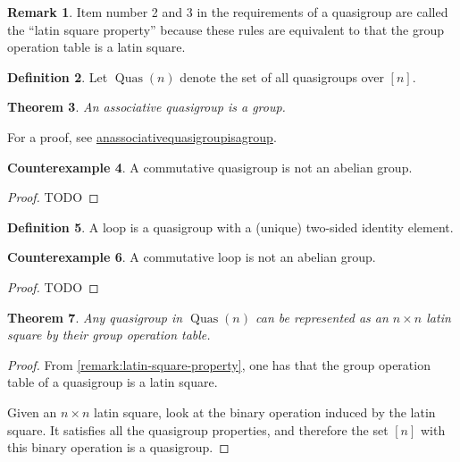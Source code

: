 \documentclass[a4paper, 12pt, english]{article}
\theoremstyle{plain}
\newtheorem{theorem}{Theorem}[section]
\theoremstyle{definition}
\newtheorem{definition}[theorem]{Definition}
\newtheorem{counterexample}[theorem]{Counterexample}
\newtheorem{remark}[theorem]{Remark}
\DeclareMathOperator{\Quas}{Quas}
\begin{document}
\begin{remark} \label{remark:latin-square-property}
    Item number 2 and 3 in the requirements of a quasigroup are called the ``latin square property'' because these rules are equivalent to that the group operation table is a latin square.
\end{remark}

\begin{definition}
    Let \( \Quas(n) \) denote the set of all quasigroups over \( [n] \).
\end{definition}

\begin{theorem}
    An associative quasigroup is a group.
\end{theorem}
For a proof, see \href{https://www.planetmath.org/anassociativequasigroupisagroup}{anassociativequasigroupisagroup}.

\begin{counterexample}
    A commutative quasigroup is not an abelian group.
\end{counterexample}
\begin{proof}
    TODO
\end{proof}

\begin{definition}
    A loop is a quasigroup with a (unique) two-sided identity element.
\end{definition}

\begin{counterexample}
    A commutative loop is not an abelian group.
\end{counterexample}
\begin{proof}
    TODO
\end{proof}

\begin{theorem}
    Any quasigroup in \( \Quas(n) \) can be represented as an \( n \times n \) latin square by their group operation table.
\end{theorem}
\begin{proof}
    From \autoref{remark:latin-square-property}, one has that the group operation table of a quasigroup is a latin square.

    Given an \( n \times n \) latin square, look at the binary operation induced by the latin square. It satisfies all the quasigroup properties, and therefore the set \( [n] \) with this binary operation is a quasigroup.
\end{proof}
\end{document}
